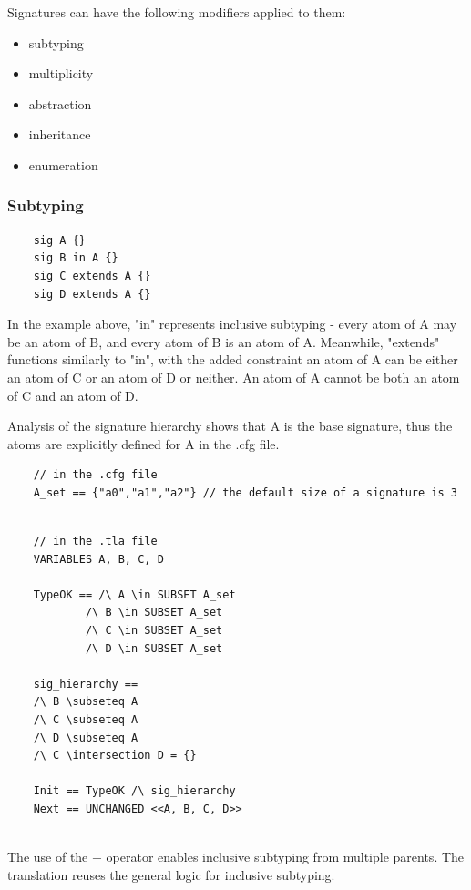 Signatures can have the following modifiers applied to them:

\begin{itemize}
	\item subtyping
	\item multiplicity
	\item abstraction
	\item inheritance
	\item enumeration
	
\end{itemize}

\subsubsection{Subtyping}

\begin{verbatim}
	sig A {}
	sig B in A {}
	sig C extends A {}
	sig D extends A {}
\end{verbatim}

In the example above, "in" represents inclusive subtyping - every atom of A may be an atom of B, and every atom of B is an atom of A. Meanwhile, "extends" functions similarly to "in", with the added constraint an atom of A can be either an atom of C or an atom of D or neither. An atom of A cannot be both an atom of C and an atom of D.

Analysis of the signature hierarchy shows that A is the base signature, thus the atoms are explicitly defined for A in the .cfg file.



\begin{verbatim}
	// in the .cfg file
	A_set == {"a0","a1","a2"} // the default size of a signature is 3
	
\end{verbatim}

\begin{verbatim}
	// in the .tla file
	VARIABLES A, B, C, D

	TypeOK == /\ A \in SUBSET A_set
			/\ B \in SUBSET A_set
			/\ C \in SUBSET A_set
			/\ D \in SUBSET A_set

	sig_hierarchy ==
	/\ B \subseteq A
	/\ C \subseteq A
	/\ D \subseteq A
	/\ C \intersection D = {}

	Init == TypeOK /\ sig_hierarchy
	Next == UNCHANGED <<A, B, C, D>>
	
\end{verbatim}

The use of the + operator enables inclusive subtyping from multiple parents. The translation reuses the general logic for inclusive subtyping.

